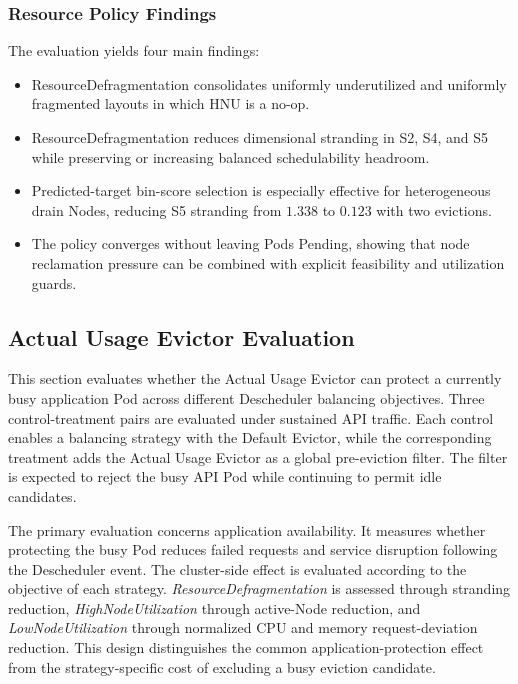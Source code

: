 \subsubsection{Resource Policy Findings}
\label{sec:defrag_findings}

The evaluation yields four main findings:

\begin{itemize}
    \item ResourceDefragmentation consolidates uniformly underutilized and uniformly fragmented layouts in which HNU is a no-op.
    \item ResourceDefragmentation reduces dimensional stranding in S2, S4, and S5 while preserving or increasing balanced schedulability headroom.
    \item Predicted-target bin-score selection is especially effective for heterogeneous drain Nodes, reducing S5 stranding from \(1.338\) to \(0.123\) with two evictions.
    \item The policy converges without leaving Pods Pending, showing that node reclamation pressure can be combined with explicit feasibility and utilization guards.
\end{itemize}

\subsection{Actual Usage Evictor Evaluation}
\label{sec:actualusage4_test}
This section evaluates whether the Actual Usage Evictor can protect a currently busy application Pod across different Descheduler balancing objectives. Three control-treatment pairs are evaluated under sustained API traffic. Each control enables a balancing strategy with the Default Evictor, while the corresponding treatment adds the Actual Usage Evictor as a global pre-eviction filter. The filter is expected to reject the busy API Pod while continuing to permit idle candidates.

The primary evaluation concerns application availability. It measures whether protecting the busy Pod reduces failed requests and service disruption following the Descheduler event. The cluster-side effect is evaluated according to the objective of each strategy. \textit{ResourceDefragmentation} is assessed through stranding reduction, \textit{HighNodeUtilization} through active-Node reduction, and \textit{LowNodeUtilization} through normalized CPU and memory request-deviation reduction. This design distinguishes the common application-protection effect from the strategy-specific cost of excluding a busy eviction candidate.

